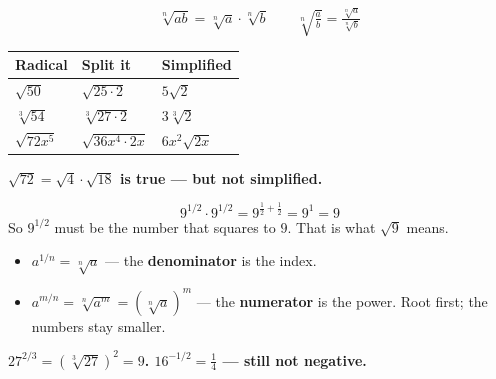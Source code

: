 \documentclass[aspectratio=169, 11pt]{beamer}
\begin{document}
\begin{frame}[t, plain]
  \[ \sqrt[n]{ab}=\sqrt[n]{a}\cdot\sqrt[n]{b} \qquad
     \sqrt[n]{\tfrac{a}{b}}=\tfrac{\sqrt[n]{a}}{\sqrt[n]{b}} \]
  \renewcommand{\arraystretch}{1.5}
  \begin{tabularx}{\textwidth}{@{}p{3.4cm} p{4.6cm} X@{}}
    \textbf{Radical} & \textbf{Split it} & \textbf{Simplified} \\
    \hline
    $\sqrt{50}$       & $\sqrt{25\cdot 2}$       & $5\sqrt{2}$ \\
    $\sqrt[3]{54}$    & $\sqrt[3]{27\cdot 2}$    & $3\sqrt[3]{2}$ \\
    $\sqrt{72x^5}$    & $\sqrt{36x^4\cdot 2x}$   & $6x^2\sqrt{2x}$ \\
  \end{tabularx}
  \vspace{0.3cm}

  {\color{goldacc}\bfseries $\sqrt{72}=\sqrt4\cdot\sqrt{18}$ is true --- but not simplified.}
\end{frame}

\begin{frame}[t, plain]
  \[ 9^{1/2}\cdot 9^{1/2} = 9^{\frac12+\frac12} = 9^1 = 9 \]
  So $9^{1/2}$ must be the number that squares to $9$. That is what $\sqrt{9}$ means.
  \begin{itemize}
    \setlength{\itemsep}{0.3cm}
    \item $a^{1/n}=\sqrt[n]{a}$ --- the \textbf{denominator} is the index.
    \item $a^{m/n}=\sqrt[n]{a^m}=\left(\sqrt[n]{a}\right)^m$ --- the \textbf{numerator} is the
          power. Root first; the numbers stay smaller.
  \end{itemize}
  \vspace{0.2cm}

  {\color{royal}\bfseries $27^{2/3}=\left(\sqrt[3]{27}\right)^2=9$. \quad
   $16^{-1/2}=\tfrac14$ --- still not negative.}
\end{frame}
\end{document}
